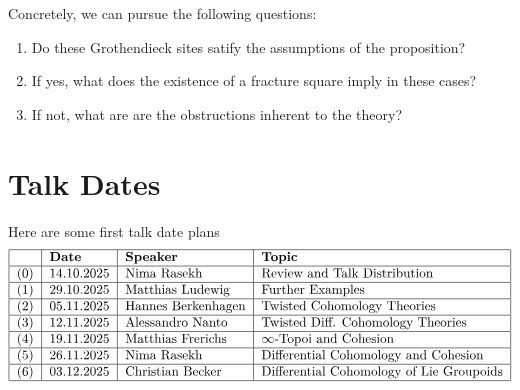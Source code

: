 \documentclass[10pt]{amsart}
\begin{document}
Concretely, we can pursue the following questions:
\begin{enumerate}
  \item Do these Grothendieck sites satify the assumptions of the proposition?
  \item If yes, what does the existence of a fracture square imply in these cases?
  \item If not, what are are the obstructions inherent to the theory?
\end{enumerate}


  
\section{Talk Dates}
Here are some first talk date plans
\[
 \begin{tabular}{|l|l|l|l|}
  \hline 
  & \textbf{Date} & \textbf{Speaker} & \textbf{Topic} \\ \hline 
  (0) & 14.10.2025 & Nima Rasekh & Review and Talk Distribution \\ \hline
  (1) & 29.10.2025 & Matthias Ludewig & Further Examples\\ \hline
  (2) & 05.11.2025 & Hannes Berkenhagen & Twisted Cohomology Theories\\ \hline
  (3) & 12.11.2025 & Alessandro Nanto & Twisted Diff. Cohomology Theories\\ \hline
  (4) & 19.11.2025 & Matthias Frerichs & $\infty$-Topoi and Cohesion\\ \hline
  (5) & 26.11.2025 & Nima Rasekh & Differential Cohomology and Cohesion\\ \hline
  (6) & 03.12.2025 & Christian Becker & Differential Cohomology of Lie Groupoids \\ \hline
 \end{tabular} 
\]
{\footnotesize


}
\end{document}
